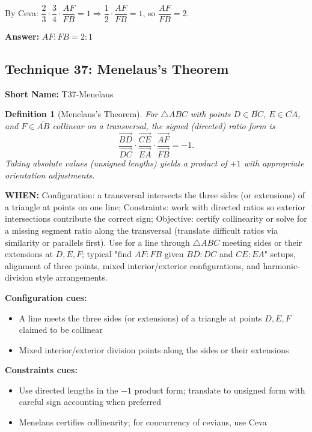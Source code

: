 \documentclass[12pt]{article}
\newtheorem{definition}{Definition}[section]
\newenvironment{solution}
{\begin{tcolorbox}[colback=green!5!white,colframe=green!75!black,title={Solution}]}{\end{tcolorbox}}
\begin{document}
\begin{solution}
By Ceva: $\dfrac{2}{3}\cdot \dfrac{3}{4}\cdot \dfrac{AF}{FB} = 1 \Rightarrow \dfrac{1}{2}\cdot \dfrac{AF}{FB} = 1$, so $\dfrac{AF}{FB} = 2$.

\textbf{Answer:} $AF:FB = 2:1$
\end{solution}

\subsection{Technique 37: Menelaus's Theorem}
\textbf{Short Name:} T37-Menelaus

\begin{definition}[Menelaus's Theorem]
For $\triangle ABC$ with points $D \in \overline{BC}$, $E \in \overline{CA}$, and $F \in \overline{AB}$ collinear on a transversal, the signed (directed) ratio form is
\[
\frac{\overrightarrow{BD}}{\overrightarrow{DC}}\cdot\frac{\overrightarrow{CE}}{\overrightarrow{EA}}\cdot\frac{\overrightarrow{AF}}{\overrightarrow{FB}} = -1.
\]
Taking absolute values (unsigned lengths) yields a product of $+1$ with appropriate orientation adjustments.
\end{definition}

\textbf{WHEN:} Configuration: a transversal intersects the three sides (or extensions) of a triangle at points on one line; Constraints: work with directed ratios so exterior intersections contribute the correct sign; Objective: certify collinearity or solve for a missing segment ratio along the transversal (translate difficult ratios via similarity or parallels first). Use for a line through $\triangle ABC$ meeting sides or their extensions at $D,E,F$; typical "find $AF:FB$ given $BD:DC$ and $CE:EA$" setups, alignment of three points, mixed interior/exterior configurations, and harmonic-division style arrangements.

\textbf{Configuration cues:}
\begin{itemize}
    \item A line meets the three sides (or extensions) of a triangle at points $D, E, F$ claimed to be collinear
    \item Mixed interior/exterior division points along the sides or their extensions
\end{itemize}

\textbf{Constraints cues:}
\begin{itemize}
    \item Use directed lengths in the $-1$ product form; translate to unsigned form with careful sign accounting when preferred
    \item Menelaus certifies collinearity; for concurrency of cevians, use Ceva
\end{itemize}
\end{document}
